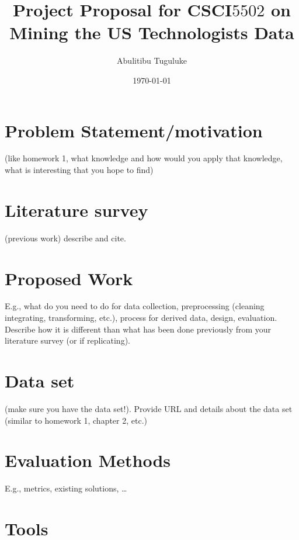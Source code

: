 \documentclass{article}
\title{Project Proposal for CSCI$5502$ on Mining the US Technologists Data}
\author{Abulitibu Tuguluke}
\date{\today}
\begin{document}
\maketitle


\section{ Problem Statement/motivation}
 (like homework 1, what knowledge and how would you apply that knowledge, what is interesting that you hope to find)
\section{Literature survey }
(previous work) describe and cite.
\section{Proposed Work }
 E.g., what do you need to do for data collection, preprocessing (cleaning  integrating, transforming, etc.), process for derived data, design, evaluation. Describe how it is different than what has been done previously from your literature survey (or if replicating).
\section{Data set }
(make sure you have the data set!). Provide URL and details about the data set (similar to homework 1, chapter 2, etc.)
\section{ Evaluation Methods }
E.g., metrics, existing solutions, …
\section{Tools}
\end{document}
